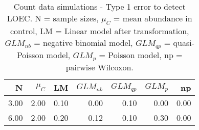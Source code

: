 \begin{table}[H]
\centering
\caption{Count data simulations - Type 1 error to detect LOEC. N = sample sizes, 
             $\mu_C$ = mean abundance in control, LM = Linear model after transformation, 
             $GLM_{nb}$ = negative binomial model, $GLM_{qp}$ = quasi-Poisson model, 
            $GLM_{p}$ = Poisson model, np = pairwise Wilcoxon.} 
\label{tab:t1_loec_c}
{\footnotesize
\begin{tabular}{rrrrrrr}
  \hline
N & $\mu_C$ & LM & $GLM_{nb}$ & $GLM_{qp}$ & $GLM_{p}$ & np \\ 
  \hline
3.00 & 2.00 & 0.10 & 0.00 & 0.10 & 0.00 & 0.00 \\ 
  6.00 & 2.00 & 0.20 & 0.12 & 0.10 & 0.30 & 0.00 \\ 
   \hline
\end{tabular}
}
\end{table}

